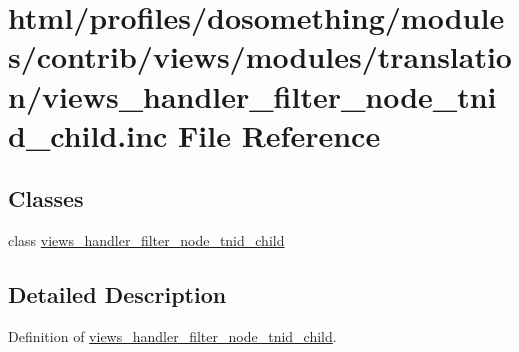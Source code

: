 \hypertarget{views__handler__filter__node__tnid__child_8inc}{
\section{html/profiles/dosomething/modules/contrib/views/modules/translation/views\_\-handler\_\-filter\_\-node\_\-tnid\_\-child.inc File Reference}
\label{views__handler__filter__node__tnid__child_8inc}
}
\subsection*{Classes}
\begin{DoxyCompactItemize}
\item 
class \hyperlink{classviews__handler__filter__node__tnid__child}{views\_\-handler\_\-filter\_\-node\_\-tnid\_\-child}
\end{DoxyCompactItemize}


\subsection{Detailed Description}
Definition of \hyperlink{classviews__handler__filter__node__tnid__child}{views\_\-handler\_\-filter\_\-node\_\-tnid\_\-child}. 
